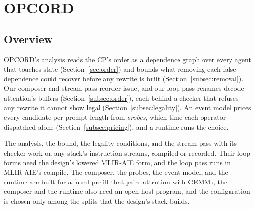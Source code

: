 \section{OPCORD}
\label{sec:method}

\subsection{Overview}
\label{subsec:overview}

OPCORD's analysis reads the CP's order as a dependence graph over every agent that touches state (Section~\ref{sec:order}) and bounds what removing each false dependence could recover before any rewrite is built (Section~\ref{subsec:removal}).
Our composer and stream pass reorder issue, and our loop pass renames decode attention's buffers (Section~\ref{subsec:order}), each behind a checker that refuses any rewrite it cannot show legal (Section~\ref{subsec:legality}).
An event model prices every candidate per prompt length from \emph{probes}, which time each operator dispatched alone (Section~\ref{subsec:pricing}), and a runtime runs the choice.

The analysis, the bound, the legality conditions, and the stream pass with its checker work on any stack's instruction streams, compiled or recorded.
Their loop forms need the design's lowered MLIR-AIE form, and the loop pass runs in MLIR-AIE's compile.
The composer, the probes, the event model, and the runtime are built for a fused prefill that pairs attention with GEMMs, the composer and the runtime also need an open host program, and the configuration is chosen only among the splits that the design's stack builds.

